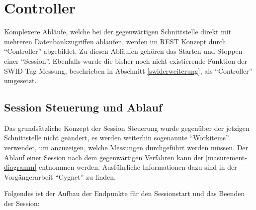 \section{Controller}
Komplexere Abläufe, welche bei der gegenwärtigen Schnittstelle direkt mit
mehreren Datenbankzugriffen ablaufen, werden im REST Konzept durch
\enquote{Controller} abgebildet. Zu diesen Abläufen gehören das Starten und
Stoppen einer \enquote{Session}. Ebenfalls wurde die bisher noch nicht
existierende Funktion der SWID Tag Messung, beschrieben in Abschnitt
\ref{swiderweiterung}, als \enquote{Controller} umgesetzt.

\subsection{Session Steuerung und Ablauf}
Das grundsätzliche Konzept der Session Steuerung wurde gegenüber der jetzigen
Schnittstelle nicht geändert, es werden weiterhin sogenannte \enquote{Workitems}
verwendet, um anzuzeigen, welche Messungen durchgeführt werden müssen. Der Ablauf
einer Session nach dem gegenwärtigen Verfahren kann der 
\autoref{masurement-diagramm} entnommen werden. Ausführliche
Informationen dazu sind in der Vorgängerarbeit
\enquote{Cygnet}\cite{cygnet:2013} zu finden.

Folgendes ist der Aufbau der Endpunkte für den Sessionstart und das Beenden der
Session:

